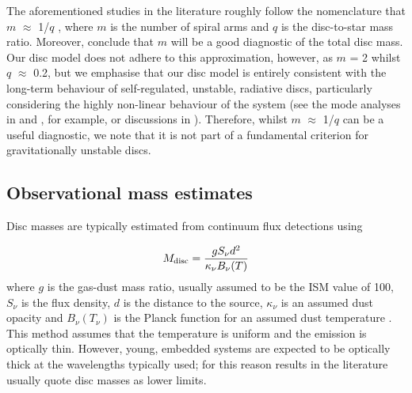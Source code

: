 \documentclass[fleqn,usenatbib]{mnras}
\begin{document}
\smallskip

The aforementioned studies in the literature roughly follow the nomenclature that $m$ $\approx$ 1/$q$ \citep[see][Figure 8]{Cossins&Lodato2009}, where $m$ is the number of spiral arms and $q$ is the disc-to-star mass ratio. Moreover, \citet{Dong&Hall2015} conclude that $m$ will be a good diagnostic of the total disc mass. Our disc model does not adhere to this approximation, however, as $m$ = 2 whilst $q$ $\approx$ 0.2, but we emphasise that our disc model is entirely consistent with the long-term behaviour of self-regulated, unstable, radiative discs, particularly considering the highly non-linear behaviour of the system (see the mode analyses in \citet{Mejia&Durisen2005} and \citet{Boley&Durisen2006}, for example, or discussions in \citet{Durisen&Boss2007}). Therefore, whilst $m$ $\approx$ 1/$q$ can be a useful diagnostic, we note that it is not part of a fundamental criterion for gravitationally unstable discs.

\subsection{Observational mass estimates}
\label{sec:massobs}

Disc masses are typically estimated from continuum flux detections using

\begin{equation}
    M_{\rm disc} = \frac{gS_\nu d^2}{\kappa_\nu B_\nu(T)}
    \label{eq:mass}
\end{equation}
where $g$ is the gas-dust mass ratio, usually assumed to be the ISM value of 100, $S_\nu$ is the flux density, $d$ is the distance to the source, $\kappa_\nu$ is an assumed dust opacity and $B_\nu(T_\nu)$ is the Planck function for an assumed dust temperature \citep{Hildebrand1983}. This method assumes that the temperature is uniform and the emission is optically thin. However, young, embedded systems are expected to be optically thick at the wavelengths typically used; for this reason results in the literature usually quote disc masses as lower limits. 

\smallskip
\end{document}
